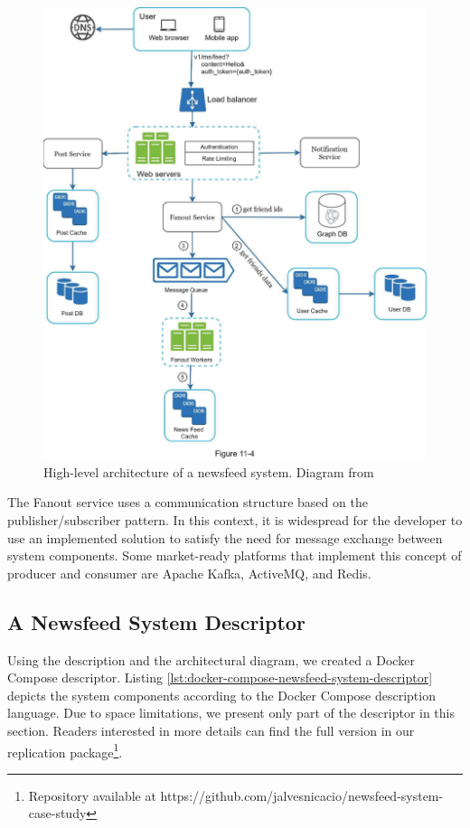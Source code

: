 \documentclass[sigconf]{acmart}
\begin{document}
\begin{figure}[htp]
    \includegraphics[width=0.97\columnwidth]{figures/architectural-diagram-adhoc-xu.pdf}
    \caption{High-level architecture of a newsfeed system. Diagram from \cite{xu2020}}
    \label{fig:newsfeed-system-adhoc-xu-diagram}
\end{figure}

The Fanout service uses a communication structure based on the publisher/subscriber pattern. In this context, it is widespread for the developer to use an implemented solution to satisfy the need for message exchange between system components. Some market-ready platforms that implement this concept of producer and consumer are Apache Kafka, ActiveMQ, and Redis.

\subsection{A Newsfeed System Descriptor}
Using the description and the architectural diagram, we created a Docker Compose descriptor. Listing \ref{lst:docker-compose-newsfeed-system-descriptor} depicts the system components according to the Docker Compose description language. Due to space limitations, we present only part of the descriptor in this section. Readers interested in more details can find the full version in our replication package\footnote{Repository available at https://github.com/jalvesnicacio/newsfeed-system-case-study}.
\end{document}
